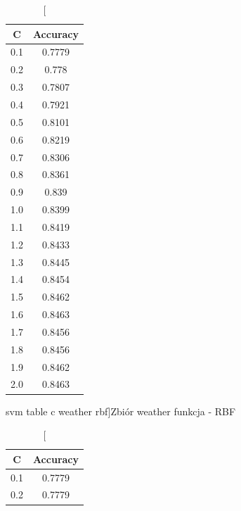 \documentclass{classrep}
\begin{document}
{{\begin{table}[!htbp]
\begin{minipage}{.3\textwidth}
\begin{tabular}{|c|c|}
                        \hline
                        C & Accuracy \\ \hline
                        0.1 & 0.7779 \\ \hline
                        0.2 & 0.778 \\ \hline
                        0.3 & 0.7807 \\ \hline
                        0.4 & 0.7921 \\ \hline
                        0.5 & 0.8101 \\ \hline
                        0.6 & 0.8219 \\ \hline
                        0.7 & 0.8306 \\ \hline
                        0.8 & 0.8361 \\ \hline
                        0.9 & 0.839 \\ \hline
                        1.0 & 0.8399 \\ \hline
                        1.1 & 0.8419 \\ \hline
                        1.2 & 0.8433 \\ \hline
                        1.3 & 0.8445 \\ \hline
                        1.4 & 0.8454 \\ \hline
                        1.5 & 0.8462 \\ \hline
                        1.6 & 0.8463 \\ \hline
                        1.7 & 0.8456 \\ \hline
                        1.8 & 0.8456 \\ \hline
                        1.9 & 0.8462 \\ \hline
                        2.0 & 0.8463 \\ \hline
                    \end{tabular}
                    \caption
                    [svm table c weather rbf]{Zbiór weather funkcja - RBF}
                    \label{svm_table_c_weather_rbf}
                \end{minipage}
                \hfill
                \begin{minipage}{.3\textwidth}
                    \centering
                    \begin{tabular}{|c|c|}
                        \hline
                        C & Accuracy \\ \hline
                        0.1 & 0.7779 \\ \hline
                        0.2 & 0.7779 \\ \hline

\end{tabular}
\end{minipage}
\end{table}}}
\end{document}
